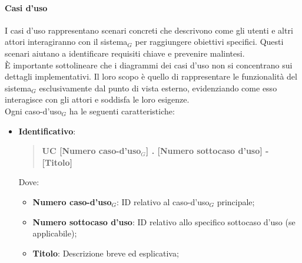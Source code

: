 \documentclass[10pt]{article}
\begin{document}
\begin{justify}
        \paragraph{Casi d'uso}
        I casi d'uso rappresentano scenari concreti che descrivono come gli utenti e altri attori interagiranno con il sistema$_G$ per raggiungere obiettivi specifici. Questi scenari aiutano a identificare requisiti chiave e prevenire malintesi.\\
        È importante sottolineare che i diagrammi dei casi d'uso non si concentrano sui dettagli implementativi. Il loro scopo è quello di rappresentare le funzionalità del sistema$_G$ esclusivamente dal punto di vista esterno, evidenziando come esso interagisce con gli attori e soddisfa le loro esigenze.\\
        Ogni caso-d'uso$_G$ ha le seguenti caratteristiche:
        \begin{itemize}
            \item \textbf{Identificativo}:
            \begin{quote}
                \textbf{UC [Numero caso-d'uso$_G$] . [Numero sottocaso d'uso] - [Titolo]}
            \end{quote}
            Dove:
            \begin{itemize}
                \item \textbf{Numero caso-d'uso$_G$}: ID relativo al caso-d'uso$_G$ principale;
                \item \textbf{Numero sottocaso d'uso}: ID relativo allo specifico sottocaso d'uso (se applicabile);
                \item \textbf{Titolo}: Descrizione breve ed esplicativa;
            \end{itemize}


\end{itemize}
\end{justify}
\end{document}
